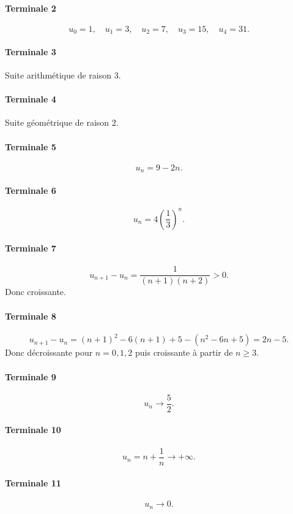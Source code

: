 \documentclass[11pt,a4paper]{article}
\theoremstyle{definition}
\begin{document}
\paragraph{Terminale 2}
\[
u_0=1,\quad u_1=3,\quad u_2=7,\quad u_3=15,\quad u_4=31.
\]

\paragraph{Terminale 3}
Suite arithmétique de raison $3$.

\paragraph{Terminale 4}
Suite géométrique de raison $2$.

\paragraph{Terminale 5}
\[
u_n=9-2n.
\]

\paragraph{Terminale 6}
\[
u_n=4\left(\frac13\right)^n.
\]

\paragraph{Terminale 7}
\[
u_{n+1}-u_n=\frac1{(n+1)(n+2)}>0.
\]
Donc croissante.

\paragraph{Terminale 8}
\[
u_{n+1}-u_n=(n+1)^2-6(n+1)+5-(n^2-6n+5)=2n-5.
\]
Donc décroissante pour $n=0,1,2$ puis croissante à partir de $n\ge3$.

\paragraph{Terminale 9}
\[
u_n\to \frac52.
\]

\paragraph{Terminale 10}
\[
u_n=n+\frac1n \to +\infty.
\]

\paragraph{Terminale 11}
\[
u_n\to0.
\]
\end{document}
